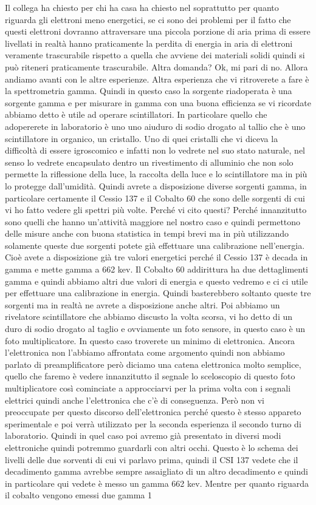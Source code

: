 Il collega ha chiesto per chi ha casa ha chiesto nel soprattutto per quanto riguarda gli elettroni meno energetici, se ci sono dei problemi per il fatto che questi elettroni dovranno attraversare una piccola porzione di aria prima di essere livellati in realtà hanno praticamente la perdita di energia in aria di elettroni veramente trascurabile rispetto a quella che avviene dei materiali solidi quindi si può riteneri praticamente trascurabile. Altra domanda? Ok, mi pari di no. Allora andiamo avanti con le altre esperienze. Altra esperienza che vi ritroverete a fare è la spettrometria gamma. Quindi in questo caso la sorgente riadoperata è una sorgente gamma e per misurare in gamma con una buona efficienza se vi ricordate abbiamo detto è utile ad operare scintillatori. In particolare quello che adopererete in laboratorio è uno uno aiuduro di sodio drogato al tallio che è uno scintillatore in organico, un cristallo. Uno di quei cristalli che vi diceva la difficoltà di essere igroscomico e infatti non lo vedrete nel suo stato naturale, nel senso lo vedrete encapsulato dentro un rivestimento di alluminio che non solo permette la riflessione della luce, la raccolta della luce e lo scintillatore ma in più lo protegge dall'umidità. Quindi avrete a disposizione diverse sorgenti gamma, in particolare certamente il Cessio 137 e il Cobalto 60 che sono delle sorgenti di cui vi ho fatto vedere gli spettri più volte. Perché vi cito questi? Perché innanzitutto sono quelli che hanno un'attività maggiore nel nostro caso e quindi permettono delle misure anche con buona statistica in tempi brevi ma in più utilizzando solamente queste due sorgenti potete già effettuare una calibrazione nell'energia. Cioè avete a disposizione già tre valori energetici perché il Cessio 137 è decada in gamma e mette gamma a 662 kev. Il Cobalto 60 addirittura ha due dettaglimenti gamma e quindi abbiamo altri due valori di energia e questo vedremo e ci ci utile per effettuare una calibrazione in energia. Quindi basterebbero soltanto queste tre sorgenti ma in realtà ne avrete a disposizione anche altri. Poi abbiamo un rivelatore scintillatore che abbiamo discusto la volta scorsa, vi ho detto di un duro di sodio drogato al taglio e ovviamente un foto sensore, in questo caso è un foto multiplicatore. In questo caso troverete un minimo di elettronica. Ancora l'elettronica non l'abbiamo affrontata come argomento quindi non abbiamo parlato di preamplificatore però diciamo una catena elettronica molto semplice, quello che faremo è vedere innanzitutto il segnale lo sceloscopio di questo foto multiplicatore così cominciate a approcciarvi per la prima volta con i segnali elettrici quindi anche l'elettronica che c'è di conseguenza. Però non vi preoccupate per questo discorso dell'elettronica perché questo è stesso appareto sperimentale e poi verrà utilizzato per la seconda esperienza il secondo turno di laboratorio. Quindi in quel caso poi avremo già presentato in diversi modi elettroniche quindi potremmo guardarli con altri occhi. Questo è lo schema dei livelli delle due sorventi di cui vi parlavo prima, quindi il CSI 137 vedete che il decadimento gamma avrebbe sempre assaigliato di un altro decadimento e quindi in particolare qui vedete è messo un gamma 662 kev. Mentre per quanto riguarda il cobalto vengono emessi due gamma 1 